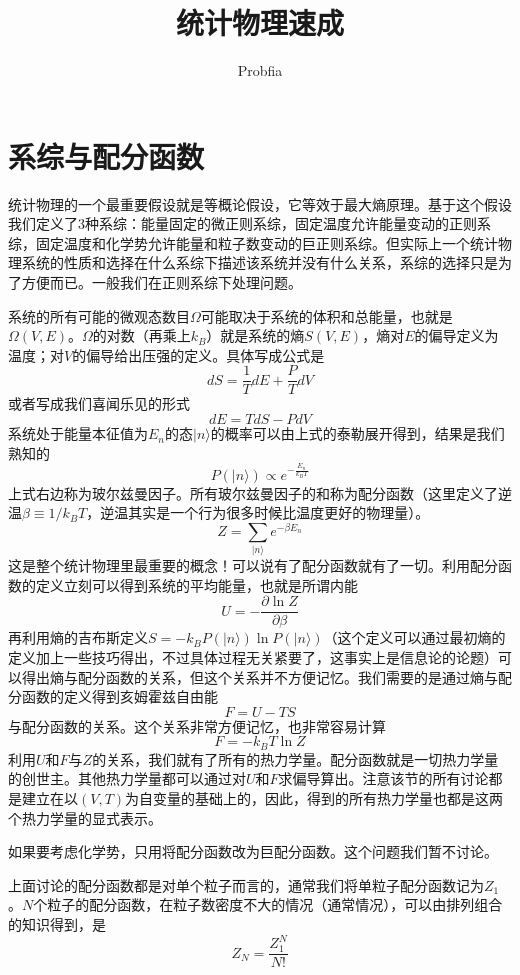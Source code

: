 \documentclass[a4paper,11pt]{ctexart}
\title{统计物理速成}
\author{Probfia}
\date{}
\newcommand{\beq}{\begin{equation}}
\newcommand{\eeq}{\end{equation}}
\begin{document}
\maketitle
\tableofcontents

\section{系综与配分函数}
统计物理的一个最重要假设就是等概论假设，它等效于最大熵原理。基于这个假设我们定义了3种系综：能量固定的微正则系综，固定温度允许能量变动的正则系综，固定温度和化学势允许能量和粒子数变动的巨正则系综。但实际上一个统计物理系统的性质和选择在什么系综下描述该系统并没有什么关系，系综的选择只是为了方便而已。一般我们在正则系综下处理问题。
\par
系统的所有可能的微观态数目$\varOmega$可能取决于系统的体积和总能量，也就是$\varOmega(V,E)$。$\varOmega$的对数（再乘上$k_B$）就是系统的熵$S(V,E)$，熵对$E$的偏导定义为温度；对$V$的偏导给出压强的定义。具体写成公式是
\beq
dS = \frac{1}{T}dE + \frac{P}{T} dV
\eeq
或者写成我们喜闻乐见的形式
\beq
dE = TdS - PdV
\eeq
系统处于能量本征值为$E_n$的态$|n\rangle$的概率可以由上式的泰勒展开得到，结果是我们熟知的
\beq
P(|n\rangle) \propto e^{-\frac{E_n}{k_B T}}
\eeq
上式右边称为玻尔兹曼因子。所有玻尔兹曼因子的和称为配分函数（这里定义了逆温$\beta \equiv 1/k_B T$，逆温其实是一个行为很多时候比温度更好的物理量）。
\beq
Z = \sum_{|n\rangle} e^{-\beta E_n}
\eeq
这是整个统计物理里最重要的概念！可以说有了配分函数就有了一切。利用配分函数的定义立刻可以得到系统的平均能量，也就是所谓内能
\beq
U = - \frac{\partial \ln Z}{\partial \beta}
\eeq
再利用熵的吉布斯定义$S = - k_B P(|n\rangle) \ln P(|n\rangle)$（这个定义可以通过最初熵的定义加上一些技巧得出，不过具体过程无关紧要了，这事实上是信息论的论题）可以得出熵与配分函数的关系，但这个关系并不方便记忆。我们需要的是通过熵与配分函数的定义得到亥姆霍兹自由能
\beq
F = U - TS
\eeq
与配分函数的关系。这个关系非常方便记忆，也非常容易计算
\beq
F= - k_B T \ln Z
\eeq
利用$U$和$F$与$Z$的关系，我们就有了所有的热力学量。{\color{red}配分函数就是一切热力学量的创世主}。其他热力学量都可以通过对$U$和$F$求偏导算出。注意该节的所有讨论都是建立在以$(V,T)$为自变量的基础上的，因此，得到的所有热力学量也都是这两个热力学量的显式表示。
\par
如果要考虑化学势，只用将配分函数改为巨配分函数。这个问题我们暂不讨论。
\par
上面讨论的配分函数都是对单个粒子而言的，通常我们将单粒子配分函数记为$Z_1$。$N$个粒子的配分函数，在粒子数密度不大的情况（通常情况），可以由排列组合的知识得到，是
\beq
Z_N  =\frac{Z_1^N}{N!}
\eeq
\end{document}
